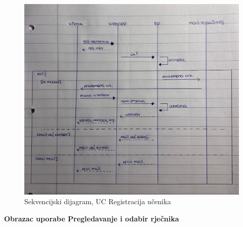 \begin{figure}[H]
	\includegraphics[scale=0.20]{dijagrami/RegistracijaUcenika.jpeg} 
	\centering
	\caption{Sekvencijski dijagram, UC Registracija učenika}
	\label{fig:uc-registracija}
\end{figure}


\textbf{{Obrazac uporabe Pregledavanje i odabir rječnika}}

